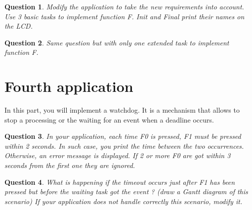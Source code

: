 \documentclass[11pt]{article}
\newtheorem{ex}{Question}
\begin{document}
\begin{center}
\begin{adjustbox}{width=14cm,keepaspectratio}
\end{adjustbox}
\end{center}


\begin{ex}
Modify the application to take the new requirements into account. Use 3 basic tasks to implement function F. Init and Final print their names on the LCD.
\end{ex}

\begin{ex}
Same question but with only one extended task to implement function F.
\end{ex}

\section{Fourth application}

In this part, you will implement a watchdog. It is a mechanism that allows to stop a processing or the waiting for an event when a deadline occurs.

\begin{ex}
In your application, each time F0 is pressed, F1 must be pressed within 2 seconds. In such case, you print the time between the two occurrences. Otherwise, an error message is displayed. If 2 or more F0 are got within 3 seconds from the first one they are ignored.
\end{ex}

\begin{ex}
What is happening if the timeout occurs just after F1 has been pressed but before the waiting task got the event ? (draw a Gantt diagram of this scenario) If your application does not handle correctly this scenario, modify it.
\end{ex}
\end{document}
